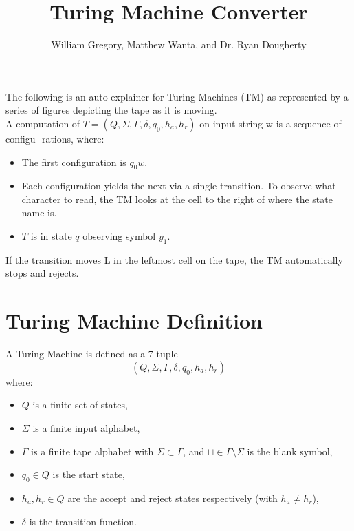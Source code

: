 


\title{\textbf{Turing Machine Converter}}
\author{William Gregory, Matthew Wanta, and Dr. Ryan Dougherty}
\date{}
\maketitle
\thispagestyle{fancy}

The following is an auto-explainer for Turing Machines (TM) as represented by a series of figures depicting the tape as it is moving. \\

A computation of $T = (Q, \Sigma, \Gamma, \delta, q_0, h_a, h_r)$ on input string w is a sequence of configu-
rations, where:
\begin{itemize}
\item The first configuration is $q_0w$.
\item Each configuration yields the next via a single transition. To observe what character to read,
the TM looks at the cell to the right of where the state name is.
\item $T$ is in state $q$ observing symbol $y_1$.
\end{itemize}
If the transition moves L in the leftmost cell on the tape, the TM automatically stops and rejects.

\section{Turing Machine Definition}

A Turing Machine is defined as a 7-tuple 
\[
(Q, \Sigma, \Gamma, \delta, q_0, h_a, h_r)
\]
where:
\begin{itemize}
    \item $Q$ is a finite set of states,
    \item $\Sigma$ is a finite input alphabet,
    \item $\Gamma$ is a finite tape alphabet with $\Sigma \subset \Gamma$, and $\sqcup \in \Gamma \setminus \Sigma$ is the blank symbol,
    \item $q_0 \in Q$ is the start state,
    \item $h_a, h_r \in Q$ are the accept and reject states respectively (with $h_a \neq h_r$),
    \item $\delta$ is the transition function.
\end{itemize}
